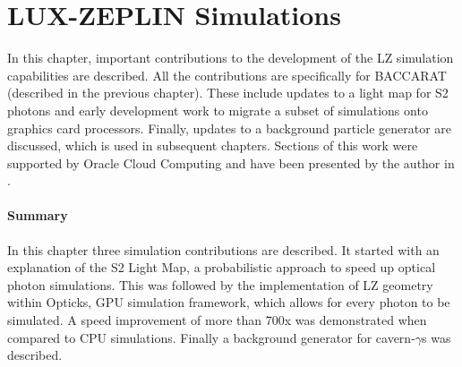 \chapter{LUX-ZEPLIN Simulations}
\label{chap:lz_simulations}
\par
In this chapter, important contributions to the development of the LZ simulation capabilities are described.
All the contributions are specifically for BACCARAT (described in the previous chapter).
These include updates to a light map for S2 photons and early development work to migrate a subset of simulations onto graphics card processors.
Finally, updates to a background particle generator are discussed, which is used in subsequent chapters.
Sections of this work were supported by Oracle Cloud Computing and have been presented by the author in \cite{se_poster_2018,se_poster_2019_summerschool,se_poster_2019_bristol,SEriksen_IoP_2021_talk_ref}.







\subsubsection*{Summary}
\par
In this chapter three simulation contributions are described.
It started with an explanation of the S2 Light Map, a probabilistic approach to speed up optical photon simulations.
This was followed by the implementation of LZ geometry within Opticks, GPU simulation framework, which allows for every photon to be simulated.
A speed improvement of more than 700x was demonstrated when compared to CPU simulations.
Finally a background generator for cavern-$\gamma$s was described.